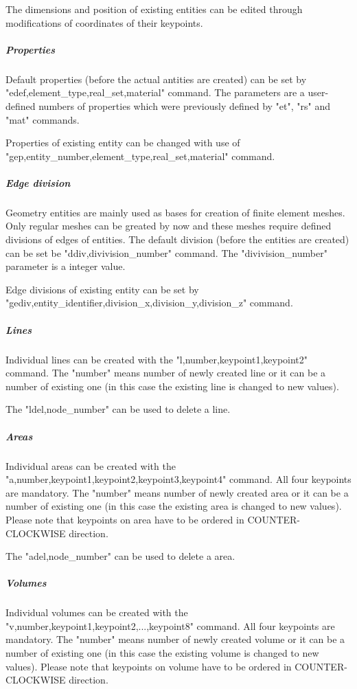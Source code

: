 \documentclass{article}
\begin{document}
 The dimensions and position of existing  entities can be edited through modifications
 of coordinates of their keypoints.



\subparagraph{Properties	}

 Default properties (before the actual antities are created) can be set
 by "edef,element\_type,real\_set,material" command.
 The parameters are a user-defined numbers of properties which
 were previously defined by "et", "rs" and "mat" commands.
 
 Properties of existing entity can be changed with use of
 "gep,entity\_number,element\_type,real\_set,material" command.



\subparagraph{Edge division}

 Geometry entities are mainly used as bases for creation of finite element meshes.
 Only regular meshes can be greated by now and these meshes require defined divisions
 of edges of entities. The default division (before the entities are created) can 
 be set be "ddiv,divivision\_number" command. The "divivision\_number" parameter
 is a integer value.

 Edge divisions of existing entity can be set by 
 "gediv,entity\_identifier,division\_x,division\_y,division\_z" command.



\subparagraph{Lines}

 Individual lines can be created with the "l,number,keypoint1,keypoint2" command.
 The "number" means number of newly created line or it can be a number of existing one 
 (in this case the existing line is changed to new values). 

 The "ldel,node\_number" can be used to delete a line.



\subparagraph{Areas}

 Individual areas can be created with the "a,number,keypoint1,keypoint2,keypoint3,keypoint4" command.
 All four keypoints are mandatory.
 The "number" means number of newly created area or it can be a number of existing one 
 (in this case the existing area is changed to new values). Please note that keypoints on area
 have to be ordered in COUNTER-CLOCKWISE direction.

 The "adel,node\_number" can be used to delete a area.



\subparagraph{Volumes}

 Individual volumes can be created with the "v,number,keypoint1,keypoint2,...,keypoint8" command.
 All four keypoints are mandatory.
 The "number" means number of newly created volume or it can be a number of existing one 
 (in this case the existing volume is changed to new values). Please note that keypoints on volume
 have to be ordered in COUNTER-CLOCKWISE direction.
\end{document}
